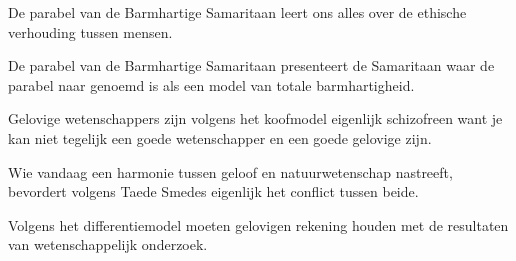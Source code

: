 \documentclass[main.tex]{subfiles}
\begin{document}
\begin{examenvraag}
    \begin{stelling}
        De parabel van de Barmhartige Samaritaan leert ons alles over de ethische verhouding tussen mensen.
    \end{stelling}

    \begin{antwoord}
    \end{antwoord}
\end{examenvraag}


\begin{examenvraag}
    \begin{stelling}
        De parabel van de Barmhartige Samaritaan presenteert de Samaritaan waar de parabel naar genoemd is als een model van totale barmhartigheid.
    \end{stelling}

    \begin{antwoord}
    \end{antwoord}
\end{examenvraag}


\begin{examenvraag}
    \begin{stelling}
        Gelovige wetenschappers zijn volgens het koofmodel eigenlijk schizofreen want je kan niet tegelijk een goede wetenschapper en een goede gelovige zijn.
    \end{stelling}

    \begin{antwoord}
    \end{antwoord}
\end{examenvraag}


\begin{examenvraag}
    \begin{stelling}
        Wie vandaag een harmonie tussen geloof en natuurwetenschap nastreeft, bevordert volgens Taede Smedes eigenlijk het conflict tussen beide.
    \end{stelling}

    \begin{antwoord}
    \end{antwoord}
\end{examenvraag}


\begin{examenvraag}
    \begin{stelling}
        Volgens het differentiemodel moeten gelovigen rekening houden met de resultaten van wetenschappelijk onderzoek.
    \end{stelling}

    \begin{antwoord}
    \end{antwoord}
\end{examenvraag}
\end{document}
